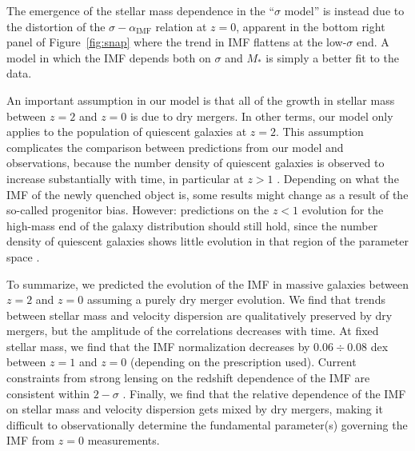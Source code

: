 \documentclass[usenatbib, letters]{mnras}
\def\aimf{\alpha_{\mathrm{IMF}}}
\def\Fref#1{Figure~\ref{#1}\xspace}
\begin{document}
The emergence of the stellar mass dependence in the ``$\sigma$ model'' is instead due to the distortion of the $\sigma-\aimf$ relation at $z=0$, apparent in the bottom right panel of \Fref{fig:snap} where the trend in IMF flattens at the low-$\sigma$ end. A model in which the IMF depends both on $\sigma$ and $M_*$ is simply a better fit to the data. 

An important assumption in our model is that all of the growth in stellar mass between $z=2$ and $z=0$ is due to dry mergers. In other terms, our model only applies to the population of quiescent galaxies at $z=2$. This assumption complicates the comparison between predictions from our model and observations, because the number density of quiescent galaxies is observed to increase substantially with time, in particular at $z>1$ \citep[e.g.][]{Ilb++13, Cas++13}. Depending on what the IMF of the newly quenched object is, some results might change as a result of the so-called progenitor bias. However: predictions on the $z<1$ evolution for the high-mass end of the galaxy distribution should still hold, since the number density of quiescent galaxies shows little evolution in that region of the parameter space \citep{Lop++12}.


To summarize, we predicted the evolution of the IMF in massive galaxies between $z=2$ and $z=0$ assuming a purely dry merger evolution.
We find that trends between stellar mass and velocity dispersion are qualitatively preserved by dry mergers, but the amplitude of the correlations decreases with time. 
At fixed stellar mass, we find that the IMF normalization decreases by $0.06\div0.08$ dex between $z=1$ and $z=0$ (depending on the prescription used). Current constraints from strong lensing on the redshift dependence of the IMF are consistent within $2-\sigma$ \citep[parameter $\zeta_{\mathrm{IMF}}$ of]{Son++15}.
Finally, we find that the relative dependence of the IMF on stellar mass and velocity dispersion gets mixed by dry mergers, making it difficult to observationally determine the fundamental parameter(s) governing the IMF from $z=0$ measurements.



\end{document}
